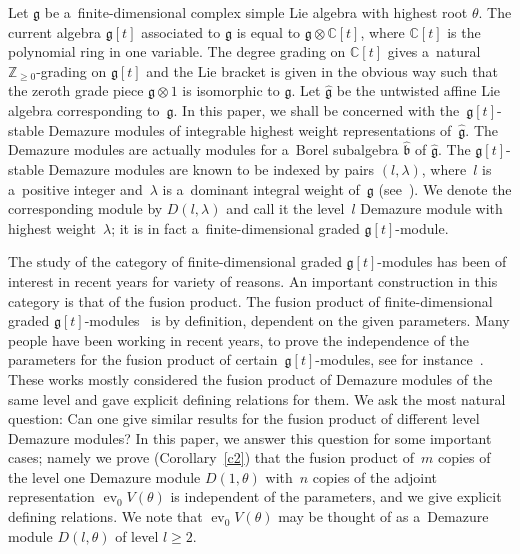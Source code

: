 \documentclass[pdftex]{sigma}
\DeclareMathOperator{\ev}{ev}
\numberwithin{equation}{section}
\begin{document}
Let $\mathfrak{g}$ be a~f\/inite-dimensional complex simple Lie algebra with highest root $\theta$. The current algebra
$\mathfrak{g}[t]$ associated to $\mathfrak{g}$ is equal to $\mathfrak{g}\otimes \mathbb{C}[t]$, where $\mathbb{C}[t]$ is
the polynomial ring in one variable.
The degree grading on $\mathbb{C}[t]$ gives a~natural $\mathbb{Z}_{\geq 0}$-grading on $\mathfrak{g}[t]$ and the Lie
bracket is given in the obvious way such that the zeroth grade piece $\mathfrak{g}\otimes 1$ is isomorphic to
$\mathfrak{g}$.
Let $\widehat{\mathfrak{g}}$ be the untwisted af\/f\/ine Lie algebra corresponding to~$\mathfrak{g}$.
In this paper, we shall be concerned with the~$\mathfrak{g}[t]$-stable Demazure modules of integrable highest weight
representations of~$\widehat{\mathfrak{g}}$. The Demazure modules are actually modules for a~Borel subalgebra
$\widehat{\mathfrak{b}}$ of $\widehat{\mathfrak{g}}$. The $\mathfrak{g}[t]$-stable Demazure modules are known to be
indexed by pairs $(l,\lambda)$, where~$l$ is a~positive integer and~$\lambda$ is a~dominant integral weight of~$\mathfrak{g}$ (see~\cite{FoL,Naoi}).
We denote the corresponding module by $D(l, \lambda)$ and call it the level~$l$ Demazure module with highest
weight~$\lambda$; it is in fact a~f\/inite-dimensional graded $\mathfrak{g}[t]$-module.

The study of the category of f\/inite-dimensional graded $\mathfrak{g}[t]$-modules has been of interest in recent years
for variety of reasons.
An important construction in this category is that of the fusion product.
The fusion product of f\/inite-dimensional graded $\mathfrak{g}[t]$-modules~\cite{FL} is by def\/inition, dependent on the
given parameters.
Many people have been working in recent years, to prove the independence of the parameters for the fusion product of
certain~$\mathfrak{g}[t]$-modules, see for instance~\cite{CSVW,CV,FoL,Naoi,V}.
These works mostly considered the fusion product of Demazure modules of the same level and gave explicit def\/ining
relations for them.
We ask the most natural question: Can one give similar results for the fusion product of dif\/ferent level Demazure
modules? In this paper, we answer this question for some important cases; namely we prove (Corollary~\ref{c2}) that the
fusion product of~$m$ copies of the level one Demazure module $D(1, \theta)$ with~$n$ copies of the adjoint
representation $\ev_0 V(\theta)$ is independent of the parameters, and we give explicit def\/ining relations.
We note that $\ev_0 V(\theta)$ may be thought of as a~Demazure module $D(l,\theta)$ of level $l\geq 2$.
\end{document}
